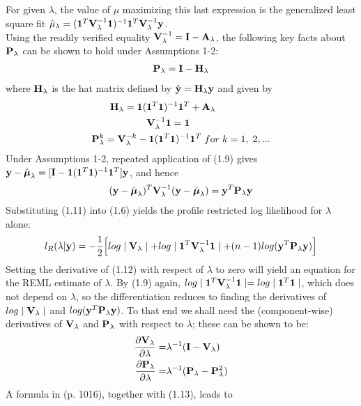 \documentclass[11pt]{article}
\begin{document}
For given $\lambda$, the value of $\mu$ maximizing this last expression is the generalized least square fit $\hat{\mu}_\lambda=(\mathbf{1}^T{\bf V}_\lambda^{-1}\mathbf{1})^{-1}\mathbf{1}^T{\bf V}_\lambda^{-1}{\bf y}$.\\
Using the readily verified equality ${\bf V}_\lambda^{-1}={\bf I}-{\bf A}_\lambda$, the following key facts about ${\bf P}_\lambda$ can be shown to hold under Assumptions 1-2:
\begin{align}
{\bf P}_\lambda={\bf I}-{\bf H}_\lambda
\end{align}
where ${\bf H}_\lambda$ is the hat matrix defined by $\hat{{\bf y}}={\bf H}_\lambda {\bf y}$ and given by
\begin{align}
{\bf H}_\lambda=\mathbf{1}(\mathbf{1}^T\mathbf{1})^{-1}\mathbf{1}^T&+{\bf A}_\lambda\\
{\bf V}_\lambda^{-1}\mathbf{1}=\mathbf{1}\\
{\bf P}_\lambda^k={\bf V}_\lambda^{-k}-\mathbf{1}(\mathbf{1}^T\mathbf{1})^{-1}&\mathbf{1}^T\;for\;k=1,\;2,...
\end{align}
Under Assumptions 1-2, repeated application of (1.9) gives ${\bf y}-\hat{\boldsymbol{\mu}}_\lambda=[{\bf I}-\mathbf{1}(\mathbf{1}^T\mathbf{1})^{-1}\mathbf{1}^T]{\bf y}$, and hence
\begin{align}
({\bf y}-\hat{\boldsymbol{\mu}}_\lambda)^T{\bf V}_\lambda^{-1}({\bf y}-\hat{\boldsymbol{\mu}}_\lambda)={\bf y}^T{\bf P}_\lambda {\bf y}
\end{align}
Substituting (1.11) into (1.6) yields the profile restricted log likelihood for $\lambda$ alone:
\begin{align}
l_R(\lambda|{\bf y})=-\frac{1}{2}\Big[log\mid {\bf V}_\lambda \mid +log \mid \mathbf{1}^T{\bf V}_\lambda^{-1}\mathbf{1} \mid+(n-1)log({\bf y}^T{\bf P}_\lambda {\bf y})\Big]
\end{align}
Setting the derivative of (1.12) with respect of $\lambda$ to zero will yield an equation for the REML estimate of $\lambda$. By (1.9) again, $log \mid \mathbf{1}^T{\bf V}_\lambda^{-1}\mathbf{1} \mid=log \mid \mathbf{1}^T\mathbf{1} \mid$, which does not depend on $\lambda$, so the differentiation reduces to finding the derivatives of $log\mid {\bf V}_\lambda \mid$ and $log({\bf y}^T{\bf P}_\lambda {\bf y})$. To that end we shall need the (component-wise) derivatives of ${\bf V}_\lambda$ and ${\bf P}_\lambda$ with respect to $\lambda$; these can be shown to be:
\begin{align}
\frac{\partial {\bf V}_\lambda}{\partial \lambda}=&\lambda^{-1}({\bf I}-{\bf V}_\lambda)\\
\frac{\partial {\bf P}_\lambda}{\partial \lambda}=&\lambda^{-1}({\bf P}_\lambda-{\bf P}_\lambda^2)
\end{align}
A formula in \citep{lindstrom_newtonraphson_1988}(p. 1016), together with (1.13), leads to
\end{document}
